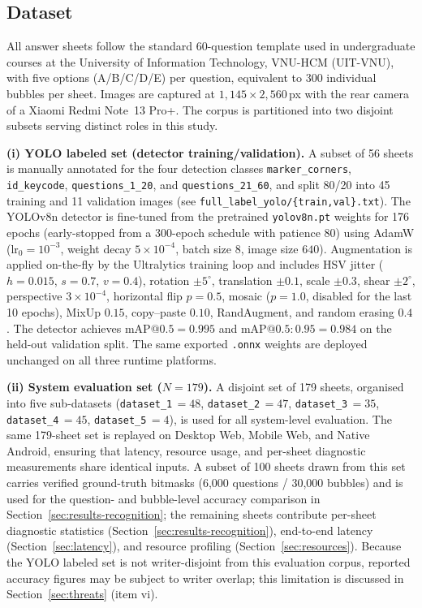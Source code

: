 \documentclass[conference]{IEEEtran}
\begin{document}
\subsection{Dataset}

All answer sheets follow the standard 60-question template used in
undergraduate courses at the University of Information Technology,
VNU-HCM (UIT-VNU), with five options (A/B/C/D/E) per question,
equivalent to 300 individual bubbles per sheet.
Images are captured at $1{,}145\times2{,}560$\,px with the rear
camera of a Xiaomi Redmi Note~13 Pro+.
The corpus is partitioned into two disjoint subsets serving distinct
roles in this study.

\textbf{(i) YOLO labeled set (detector training/validation).}
A subset of 56 sheets is manually annotated for the four detection
classes \texttt{marker\_corners}, \texttt{id\_keycode},
\texttt{questions\_1\_20}, and \texttt{questions\_21\_60}, and split
80/20 into 45 training and 11 validation images (see
\texttt{full\_label\_yolo/\{train,val\}.txt}).
The YOLOv8n detector is fine-tuned from the pretrained
\texttt{yolov8n.pt} weights for 176 epochs (early-stopped from a
300-epoch schedule with patience 80) using AdamW
($\mathrm{lr_0}{=}10^{-3}$, weight decay $5\times10^{-4}$, batch
size 8, image size $640$). Augmentation is applied on-the-fly by
the Ultralytics training loop and includes HSV jitter
($h{=}0.015$, $s{=}0.7$, $v{=}0.4$), rotation $\pm5^\circ$,
translation $\pm0.1$, scale $\pm0.3$, shear $\pm2^\circ$,
perspective $3\times10^{-4}$, horizontal flip $p{=}0.5$, mosaic
($p{=}1.0$, disabled for the last 10 epochs), MixUp $0.15$,
copy--paste $0.10$, RandAugment, and random erasing $0.4$.
The detector achieves $\mathrm{mAP}@0.5{=}0.995$ and
$\mathrm{mAP}@0.5{:}0.95{=}0.984$ on the held-out validation split.
The same exported \texttt{.onnx} weights are deployed unchanged on
all three runtime platforms.

\textbf{(ii) System evaluation set ($N{=}179$).}
A disjoint set of 179 sheets, organised into five sub-datasets
(\texttt{dataset\_1}\,$=48$, \texttt{dataset\_2}\,$=47$,
\texttt{dataset\_3}\,$=35$, \texttt{dataset\_4}\,$=45$,
\texttt{dataset\_5}\,$=4$), is used for all system-level evaluation.
The same 179-sheet set is replayed on Desktop Web, Mobile Web, and
Native Android, ensuring that latency, resource usage, and per-sheet
diagnostic measurements share identical inputs.
A subset of 100 sheets drawn from this set carries verified
ground-truth bitmasks (6{,}000 questions / 30{,}000 bubbles) and is
used for the question- and bubble-level accuracy comparison in
Section~\ref{sec:results-recognition}; the remaining sheets contribute
per-sheet diagnostic statistics (Section~\ref{sec:results-recognition}),
end-to-end latency (Section~\ref{sec:latency}), and resource
profiling (Section~\ref{sec:resources}).
Because the YOLO labeled set is not writer-disjoint from this
evaluation corpus, reported accuracy figures may be subject to writer
overlap; this limitation is discussed in
Section~\ref{sec:threats} (item vi).
\end{document}
